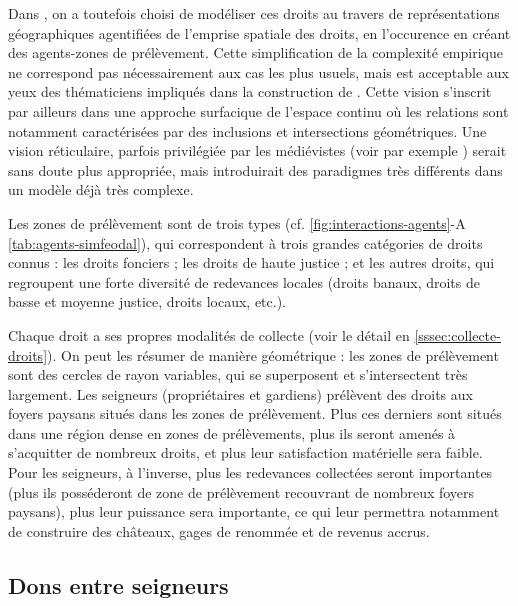 \begin{tcolorbox}[breakable,left=0pt,right=0pt,top=0pt,bottom=0pt,
	colback=gray!15,colframe=gray!15,width=\dimexpr\textwidth\relax, 
	enlarge left by=0mm, boxsep=5pt,arc=0pt,outer arc=0pt]
Dans \simfeodal{}, on a toutefois choisi de modéliser ces droits au travers de représentations géographiques agentifiées de l'emprise spatiale des droits, en l'occurence en créant des agents-zones de prélèvement.
Cette simplification de la complexité empirique ne correspond pas nécessairement aux cas les plus usuels, mais est acceptable aux yeux des thématiciens impliqués dans la construction de \simfeodal{}.
Cette vision s'inscrit par ailleurs dans une approche surfacique de l'espace continu où les relations sont notamment caractérisées par des inclusions et intersections géométriques.
Une vision réticulaire, parfois privilégiée par les médiévistes (voir par exemple \cite{jegou_potentialites_2017}) serait sans doute plus appropriée, mais introduirait des paradigmes très différents dans un modèle déjà très complexe.

\medskip
Les zones de prélèvement sont de trois types (cf. \cref{fig:interactions-agents}-A \cref{tab:agents-simfeodal}), qui correspondent à trois grandes catégories de droits connus : les droits fonciers ; les droits de haute justice ; et les autres droits, qui regroupent une forte diversité de redevances locales (droits banaux, droits de basse et moyenne justice, droits locaux, etc.).

\medskip
Chaque droit a ses propres modalités de collecte (voir le détail en \cref{sssec:collecte-droits}).
On peut les résumer de manière géométrique : les zones de prélèvement sont des cercles de rayon variables, qui se superposent et s'intersectent très largement.
Les seigneurs (propriétaires et gardiens) prélèvent des droits aux foyers paysans situés dans les zones de prélèvement.
Plus ces derniers sont situés dans une région dense en zones de prélèvements, plus ils seront amenés à s'acquitter de nombreux droits, et plus leur satisfaction matérielle sera faible.
Pour les seigneurs, à l'inverse, plus les redevances collectées seront importantes (plus ils posséderont de zone de prélèvement recouvrant de nombreux foyers paysans), plus leur puissance sera importante, ce qui leur permettra notamment de construire des châteaux, gages de renommée et de revenus accrus.
\end{tcolorbox}

\subsection{Dons entre seigneurs \label{meca-dons}}

